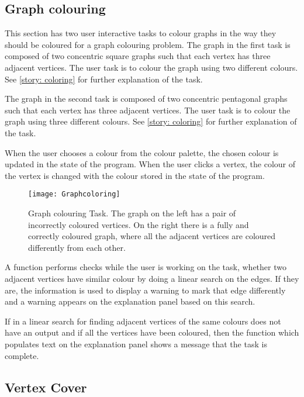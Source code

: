 \subsection{Graph colouring}
This section has two user interactive tasks to colour graphs in the way they
should be coloured for a graph colouring problem.
The graph in the first task is composed of two concentric square graphs such
that each vertex has three adjacent vertices. The user task is to colour the
graph using two different colours. See \autoref{story: coloring} for further
explanation of the task.

The graph in the second task is composed of two concentric pentagonal graphs such
that each vertex has three adjacent vertices. The user task is to colour the
graph using three different colours. See \autoref{story: coloring} for further
explanation of the task.

When the user chooses a colour from the colour palette, the chosen colour is
updated in the state of the program. When the user clicks a vertex, the colour
of the vertex is changed with the colour stored in the state of the program.

\begin{figure}[h]
\centering
\texttt{[image: Graphcoloring]}
\caption{
        Graph colouring Task. The graph on the left has a pair of incorrectly
        coloured vertices. On the right there is a fully and correctly coloured
        graph, where all the adjacent vertices are coloured differently from each
        other.
        }
\label{animationfigure: max3cut}
\end{figure}

A function performs checks while the user is working on the task, whether
two adjacent vertices have similar colour by doing a linear search on the edges.
If they are, the information is used to display a warning to mark that edge differently
and a warning appears on the explanation panel based on this search.

If in a linear search for finding adjacent vertices of the same colours
does not have an output and if all the vertices have been coloured, then
the function which populates text on the explanation panel shows a message that
the task is complete.

\subsection{Vertex Cover}


